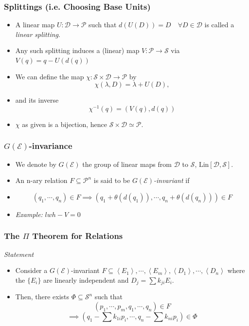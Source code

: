 \documentclass{beamer}
\newcommand{\avg}[1]{\left<#1\right>}
\begin{document}
\begin{frame}
\frametitle{Splittings (i.e. Choosing Base Units)}
\begin{itemize}
    \item<1-> A linear map $U:\mathcal{D}\rightarrow\mathcal{P}$ such that $d(U(D)) = D \quad \forall D \in \mathcal{D}$ is called a \textit{linear splitting}.
    \item<2-> Any such splitting induces a (linear) map $V:\mathcal{P}\rightarrow\mathcal{S}$ via  $V(q) = q - U(d(q))$
    \item<3-> We can define the map $\chi : \mathcal{S} \times \mathcal{D} \rightarrow \mathcal{P}$  by \[ \chi(\lambda, D) = \lambda + U(D), \]
    \item<4-> and its inverse \[ \chi^{-1}(q) = (V(q), d(q)) \]
    \item<5-> $\chi$ as given is a bijection, hence $\mathcal{S}\times\mathcal{D} \simeq \mathcal{P}$.
\end{itemize}
\end{frame}

\begin{frame}
    \frametitle{$G(\mathcal{E})$-invariance}
    \begin{itemize}
        \item<1-> We denote by $G(\mathcal{E})$ the group of linear maps from $\mathcal{D}$ to $\mathcal{S}$, $\text{Lin}[\mathcal{D}, \mathcal{S}]$.
        \item<2-> An n-ary relation $F \subseteq \mathcal{P}^n$ is said to be \textit{$G(\mathcal{E})$-invariant} if
        \item<3-> \[ (q_1, \cdots, q_n) \in F \implies (q_1 + \theta(d(q_1)), \cdots, q_n + \theta(d(q_n))) \in F \]
        \item<4-> \textit{Example: } $lwh - V = 0$
    \end{itemize}
\end{frame}

\begin{frame}
    \frametitle{The $\Pi$ Theorem for Relations}
    \alert{\textit{Statement}}
    \begin{itemize}
        \item<2->Consider a $G(\mathcal{E})$-invariant $F \subseteq \avg{E_1}, \cdots, \avg{E_m}, \avg{D_1}, \cdots, \avg{D_n}$ where the $\{E_i\}$ are linearly independent and $D_j = \sum k_{ji}E_i$.
        \item<3-> Then, there exists $\Phi \subseteq \mathcal{S}^n$ such that \[ (p_1, \cdots, p_m, q_1, \cdots, q_n) \in F \] \[ \implies (q_1 - \sum k_{1i}p_i, \cdots, q_n - \sum k_{ni}p_i) \in \Phi \] 
    \end{itemize} 
\end{frame}
\end{document}
